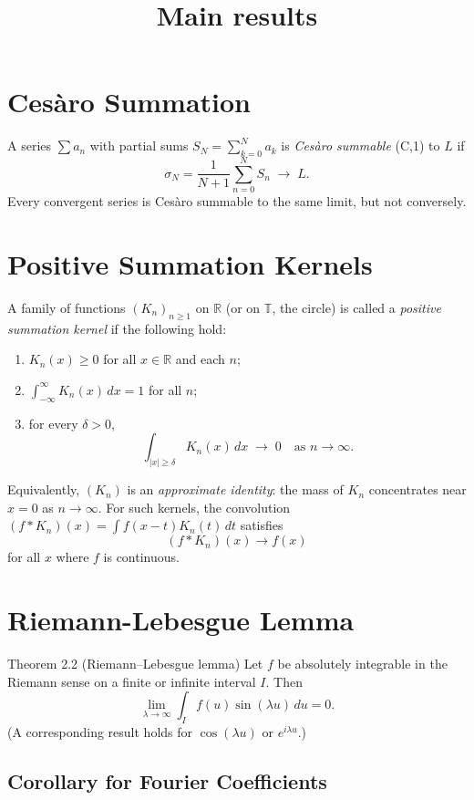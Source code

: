 \documentclass[12pt]{article}
\title{Main results}
\author{}
\date{}
\begin{document}
\maketitle
\vspace{-2em}

\section*{Cesàro Summation}

A series $\sum a_n$ with partial sums $S_N=\sum_{k=0}^{N}a_k$ is \emph{Cesàro summable} (C,1) to $L$ if  
\[
\sigma_N=\frac{1}{N+1}\sum_{n=0}^{N}S_n \;\longrightarrow\; L.
\]
Every convergent series is Cesàro summable to the same limit, but not conversely.  

\section*{Positive Summation Kernels}
A family of functions $(K_n)_{n\ge1}$ on $\mathbb{R}$ (or on $\mathbb{T}$, the circle) is called a \emph{positive summation kernel} if the following hold:
\begin{enumerate}[label=(\roman*)]
  \item $K_n(x) \ge 0$ for all $x \in \mathbb{R}$ and each $n$;
  \item $\displaystyle \int_{-\infty}^{\infty} K_n(x)\,dx = 1$ for all $n$;
  \item for every $\delta > 0$, 
  \[
    \int_{|x|\ge \delta} K_n(x)\,dx \;\longrightarrow\; 0 \quad \text{as } n \to \infty.
  \]
\end{enumerate}
Equivalently, $(K_n)$ is an \emph{approximate identity}: the mass of $K_n$ concentrates near $x=0$ as $n\to\infty$.  
For such kernels, the convolution $(f*K_n)(x) = \int f(x-t)K_n(t)\,dt$ satisfies
\[
  (f*K_n)(x) \to f(x)
\]
for all $x$ where $f$ is continuous.

\section*{Riemann-Lebesgue Lemma}

\noindent Theorem 2.2 (Riemann--Lebesgue lemma)
Let $f$ be absolutely integrable in the Riemann sense on a finite or infinite interval $I$. Then
\[
  \lim_{\lambda\to\infty} \int_{I} f(u)\sin(\lambda u)\,du = 0.
\]
(A corresponding result holds for $\cos(\lambda u)$ or $e^{i\lambda u}$.)

\subsection*{Corollary for Fourier Coefficients}
\end{document}
